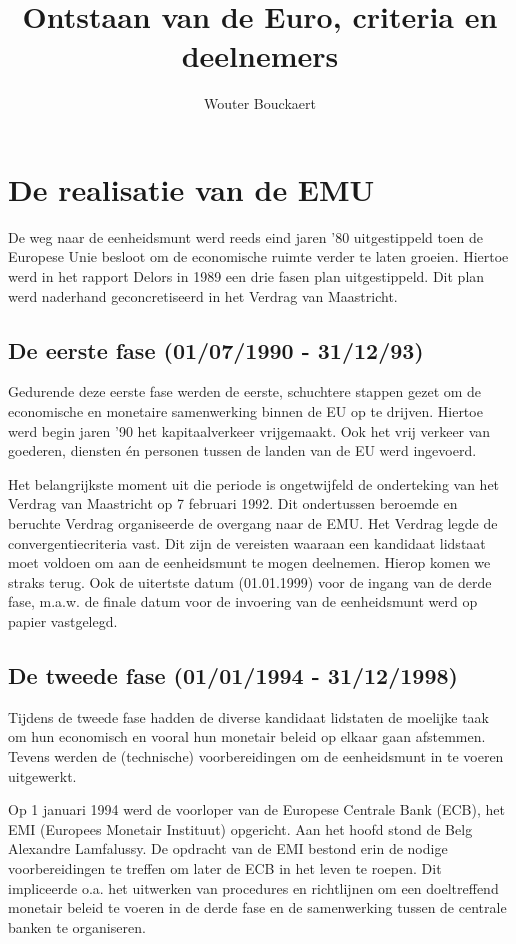 \documentclass[a4paper]{article}
\begin{document}
\title{Ontstaan van de Euro, criteria en deelnemers}
\author{Wouter Bouckaert}
\maketitle

\section{De realisatie van de EMU}

De weg naar de eenheidsmunt werd reeds eind jaren '80 uitgestippeld
toen de Europese Unie besloot om de economische ruimte verder te
laten groeien. Hiertoe werd in het rapport Delors in 1989 een drie
fasen plan uitgestippeld. Dit plan werd naderhand geconcretiseerd in
het Verdrag van Maastricht.

\subsection{De eerste fase (01/07/1990 - 31/12/93)}

Gedurende deze eerste fase werden de eerste, schuchtere stappen
gezet om de economische en monetaire samenwerking binnen de EU op te
drijven. Hiertoe werd begin jaren '90 het kapitaalverkeer
vrijgemaakt. Ook het vrij verkeer van goederen, diensten én personen
tussen de landen van de EU werd ingevoerd.

Het belangrijkste moment uit die periode is ongetwijfeld de
onderteking van het Verdrag van Maastricht op 7 februari 1992. Dit
ondertussen beroemde en beruchte Verdrag organiseerde de overgang
naar de EMU. Het Verdrag legde de convergentiecriteria vast. Dit
zijn de vereisten waaraan een kandidaat lidstaat moet voldoen om aan
de eenheidsmunt te mogen deelnemen. Hierop komen we straks terug.
Ook de uitertste datum (01.01.1999) voor de ingang van de derde
fase, m.a.w. de finale datum voor de invoering van de eenheidsmunt
werd op papier vastgelegd.

\subsection{De tweede fase (01/01/1994 - 31/12/1998)}

Tijdens de tweede fase hadden de diverse kandidaat lidstaten de
moelijke taak om hun economisch en vooral hun monetair beleid op
elkaar gaan afstemmen. Tevens werden de (technische) voorbereidingen
om de eenheidsmunt in te voeren uitgewerkt.

Op 1 januari 1994 werd de voorloper van de Europese Centrale Bank
(ECB), het EMI (Europees Monetair Instituut) opgericht. Aan het
hoofd stond de Belg Alexandre Lamfalussy. De opdracht van de EMI
bestond erin de nodige voorbereidingen te treffen om later de ECB in
het leven te roepen. Dit impliceerde o.a. het uitwerken van
procedures en richtlijnen om een doeltreffend monetair beleid te
voeren in de derde fase en de samenwerking tussen de centrale banken
te organiseren.
\end{document}
